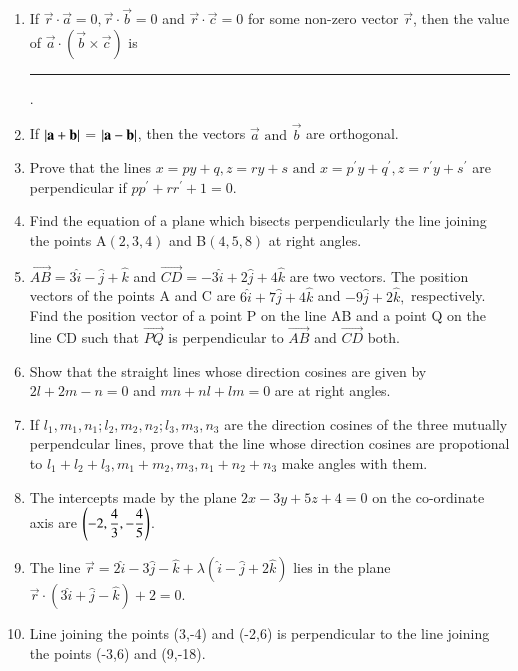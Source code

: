 \begin{enumerate}[label=\thesubsection.\arabic*,ref=\thesubsection.\theenumi]
\begin{enumerate}
\end{enumerate}
\item If $\vec{r}\cdot\vec{a}=0, \vec{r}\cdot\vec{b}=0$ and $\vec{r}\cdot\vec{c}=0$ for some non-zero vector $\vec{r}$, then the value of $\vec{a}\cdot(\vec{b}\times\vec{c})$ is \rule{1cm}{0.15mm}.
\item If $\left\vert\mathbf{a}+\mathbf{b}\right\vert$ = $\left\vert\mathbf{a}-\mathbf{b}\right\vert$, then the vectors $\vec{a}$ $\text {and}$ $\vec{b}$ are orthogonal.
\item Prove that the lines $x=py+q , z=ry+s \text{ and } x=p^{\prime}y+q^{\prime}, z=r^{\prime}y+s^{\prime} $ are perpendicular if $pp^{\prime}+rr^{\prime}+1=0$.
\item Find the equation of a plane which  bisects perpendicularly the line joining the points A$(2,3,4)$ and B$(4,5,8)$ at right angles.
\item $\overrightarrow{AB}=3\hat{i}-\hat{j}+\hat{k}$ and $\overrightarrow{CD}=-3\hat{i}+2\hat{j}+4\hat{k}$ are two vectors. The position vectors of the points A and C are $6\hat{i}+7\hat{j}+4\hat{k}$ and $-9\hat{j}+2\hat{k},$ respectively. Find the position vector of a point P on the line AB and a point Q on the line CD such that $\overrightarrow{PQ}$ is perpendicular to $\overrightarrow{AB}$ and $\overrightarrow{CD}$ both.
\item Show that the straight lines whose direction cosines are given by $2l+2m-n=0$ and $mn+nl+lm=0$ are at right angles.
\item If $l_1, m_1, n_1;l_2, m_2, n_2;l_3, m_3, n_3$ are the direction cosines of the three mutually perpendcular lines, prove that the line whose direction cosines are propotional to $l_1+l_2+l_3 , m_1+m_2,m_3, n_1+n_2+n_3$ make angles with them.
\item The intercepts made by the plane $2x-3y+5z+4=0$ on the co-ordinate axis are $\left(-2,\dfrac{4}{3},-\dfrac{4}{5}\right)$.
\item The line $\overrightarrow{r}=2\hat{i}-3\hat{j}-\hat{k}+\lambda(\hat{i}-\hat{j}+2\hat{k})$ lies in the plane $\overrightarrow{r} \cdot (3\hat{i}+\hat{j}-\hat{k})+2=0$.
\item Line joining the points (3,-4) and (-2,6) is perpendicular to the line joining the points (-3,6) and (9,-18).
\end{enumerate}
